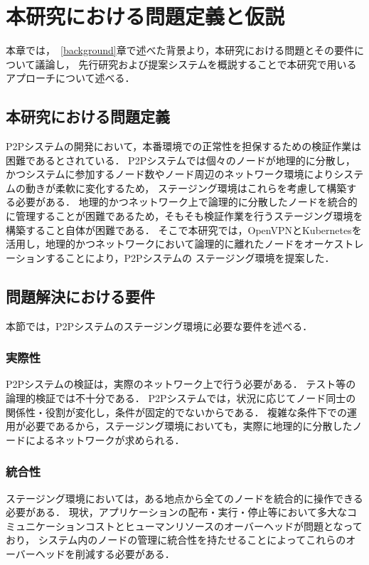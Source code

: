 \chapter{本研究における問題定義と仮説}
\label{issue}

本章では，~\ref{background}章で述べた背景より，本研究における問題とその要件について議論し，
先行研究および提案システムを概説することで本研究で用いるアプローチについて述べる．

\section{本研究における問題定義}
\label{issue:definition}
P2Pシステムの開発において，本番環境での正常性を担保するための検証作業は困難であるとされている．
P2Pシステムでは個々のノードが地理的に分散し，かつシステムに参加するノード数やノード周辺のネットワーク環境によりシステムの動きが柔軟に変化するため，
ステージング環境はこれらを考慮して構築する必要がある．
地理的かつネットワーク上で論理的に分散したノードを統合的に管理することが困難であるため，そもそも検証作業を行うステージング環境を構築すること自体が困難である．
そこで本研究では，OpenVPNとKubernetesを活用し，地理的かつネットワークにおいて論理的に離れたノードをオーケストレーションすることにより，P2Pシステムの
ステージング環境を提案した．

\section{問題解決における要件}
\label{issue:requirements}
本節では，P2Pシステムのステージング環境に必要な要件を述べる．

\subsection{実際性}
\label{issue:requirements1}
P2Pシステムの検証は，実際のネットワーク上で行う必要がある．
テスト等の論理的検証では不十分である．
P2Pシステムでは，状況に応じてノード同士の関係性・役割が変化し，条件が固定的でないからである．
複雑な条件下での運用が必要であるから，ステージング環境においても，実際に地理的に分散したノードによるネットワークが求められる．

\subsection{統合性}
\label{issue:requirements2}
ステージング環境においては，ある地点から全てのノードを統合的に操作できる必要がある．
現状，アプリケーションの配布・実行・停止等において多大なコミュニケーションコストとヒューマンリソースのオーバーヘッドが問題となっており，
システム内のノードの管理に統合性を持たせることによってこれらのオーバーヘッドを削減する必要がある．

